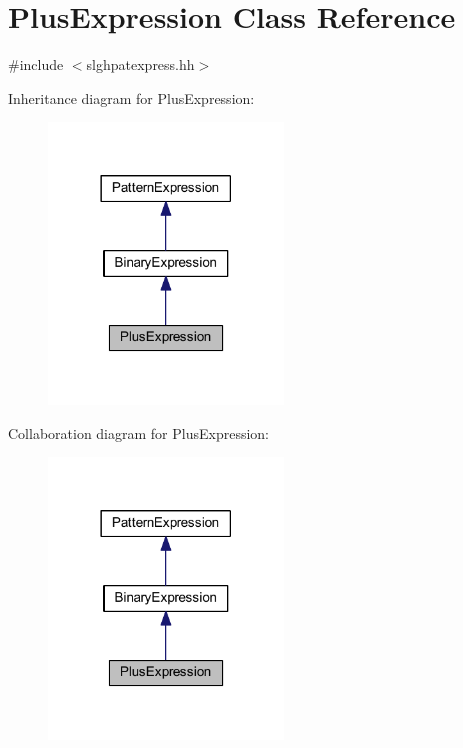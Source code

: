 \hypertarget{class_plus_expression}{}\section{Plus\+Expression Class Reference}
\label{class_plus_expression}


{\ttfamily \#include $<$slghpatexpress.\+hh$>$}



Inheritance diagram for Plus\+Expression\+:
\nopagebreak
\begin{figure}[H]
\begin{center}
\leavevmode
\includegraphics[width=177pt]{class_plus_expression__inherit__graph}
\end{center}
\end{figure}


Collaboration diagram for Plus\+Expression\+:
\nopagebreak
\begin{figure}[H]
\begin{center}
\leavevmode
\includegraphics[width=177pt]{class_plus_expression__coll__graph}
\end{center}
\end{figure}
